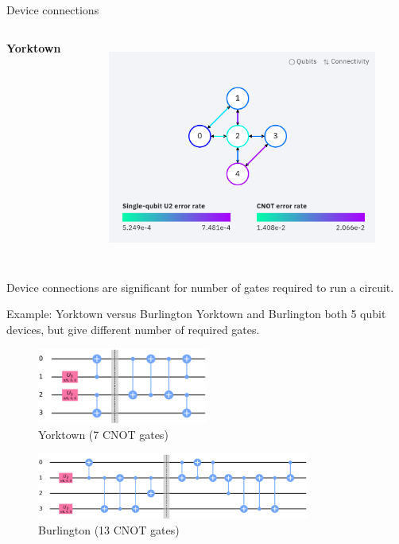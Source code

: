 \begin{frame}{Device connections}
\begin{columns}[T]
		\centering \textbf{Yorktown}
		\begin{figure}[h] \centering
			\includegraphics[width=\textwidth]{images/connection_diagram_ibmqx2.png}
			\label{fig:ibmqx2_connections}
		\end{figure}
		
	\end{columns}
Device connections are significant for number of gates required to run a circuit. 
\end{frame}

\begin{frame}{Example: Yorktown versus Burlington}
Yorktown and Burlington both 5 qubit devices, but give different number of required gates.

\begin{figure}[h] \centering
	\includegraphics[width=0.5\textwidth]{images/purification_ibmqx2.png}
	\caption*{\tiny Yorktown (7 CNOT gates)}
	\label{fig:pure_york}
\end{figure}

\begin{figure}[h] \centering
	\includegraphics[width=0.8\textwidth]{images/purification_burlington.png}
	\caption*{\tiny Burlington (13 CNOT gates)}
	\label{fig:pure_burl}
\end{figure}
\end{frame}

